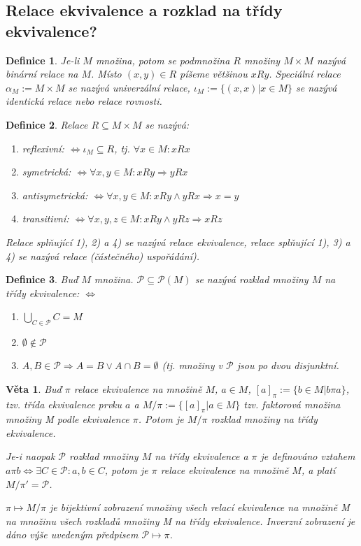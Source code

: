 \documentclass[a4paper, 11pt]{report}
\newtheorem{mydef}{Definice}[chapter]
\newtheorem{veta}{Věta}
\begin{document}
\subsection{Relace ekvivalence a rozklad na třídy ekvivalence?} %
\begin{mydef}
Je-li $M$ množina, potom se podmnožina $R$ množiny $M \times M$ nazývá binární relace na $M$. Místo $(x, y) \in R$ píšeme většinou $xRy$. Speciální relace $\alpha_M := M \times M$ se nazývá univerzální relace, $\iota_M := \{(x, x) | x \in M\}$ se nazývá identická relace nebo relace rovnosti.
\end{mydef}

\begin{mydef}
Relace $R \subseteq M \times M$ se nazývá:
\begin{enumerate}[1)]
	\item \emph{reflexivní}: $\Leftrightarrow \iota_M \subseteq R$, tj. $\forall x \in M: xRx$
	\item \emph{symetrická}: $\Leftrightarrow \forall x, y \in M: xRy \Rightarrow yRx$
	\item \emph{antisymetrická}: $\Leftrightarrow \forall x, y \in M: xRy \land yRx \Rightarrow x = y$
	\item \emph{transitivní}: $\Leftrightarrow \forall x, y, z \in M: xRy \land yRz \Rightarrow xRz$
\end{enumerate}
Relace splňující 1), 2) a 4) se nazývá relace \emph{ekvivalence}, relace splňující 1), 3) a 4) se nazývá relace \emph{(částečného) uspořádání)}.
\end{mydef}

\begin{mydef}
Buď $M$ množina. $\mathcal{P} \subseteq \mathcal{P}(M)$ se nazývá rozklad množiny $M$ na třídy ekvivalence: $\Leftrightarrow$
\begin{enumerate}[1)]
	\item $\bigcup_{C \in \mathcal{P}} C = M$
	\item $\emptyset \not\in \mathcal{P}$
	\item $A, B \in \mathcal{P}  \Rightarrow A = B \lor A \cap B = \emptyset$ (tj. množiny v $\mathcal{P}$ jsou po dvou disjunktní.
\end{enumerate}
\end{mydef}

\begin{veta}
Buď $\pi$ relace ekvivalence na množině $M$, $a \in M$, $[a]_\pi := \{b \in M | b \pi a\}$, tzv. třída ekvivalence prvku $a$ a $M/\pi := \{[a]_\pi | a \in M\}$ tzv. faktorová množina množiny M podle ekvivalence $\pi$. Potom je $M/\pi$ rozklad množiny na třídy ekvivalence.

Je-i naopak $\mathcal{P}$ rozklad množiny $M$ na třídy ekvivalence a $\pi$ je definováno vztahem $a \pi b \Leftrightarrow \exists C \in \mathcal{P}: a, b \in C$, potom je $\pi$ relace ekvivalence na množině $M$, a platí $M/\pi' = \mathcal{P}$.

$\pi \mapsto M/\pi$ je bijektivní zobrazení množiny všech relací ekvivalence na množině M na množinu všech rozkladů množiny M na třídy ekvivalence. Inverzní zobrazení je dáno výše uvedeným předpisem $\mathcal{P} \mapsto \pi$.
\end{veta}
\end{document}
